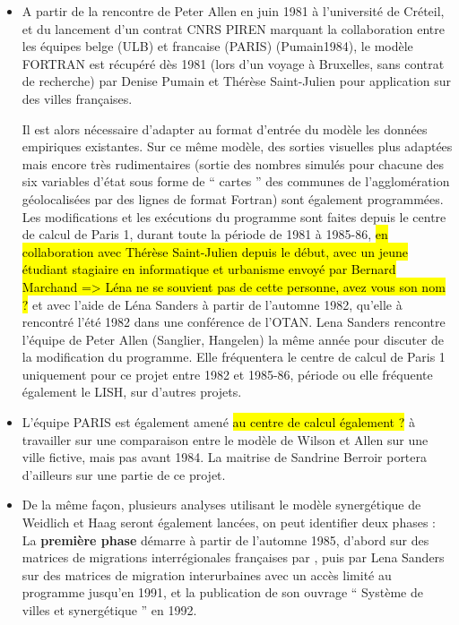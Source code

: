 \begin{itemize}[label=\textbullet]

\item A partir de la rencontre  de Peter Allen en juin 1981 à l’université de Créteil, et du lancement d’un contrat CNRS PIREN marquant la collaboration entre les équipes belge (ULB) et francaise (PARIS) (Pumain1984), le modèle FORTRAN est récupéré dès 1981 (lors d’un voyage à Bruxelles, sans contrat de recherche) par Denise Pumain et Thérèse Saint-Julien pour application sur des villes françaises.

Il est alors nécessaire d’adapter au format d’entrée du modèle les données empiriques existantes. Sur ce même modèle, des sorties visuelles plus adaptées mais encore très rudimentaires (sortie des nombres simulés pour chacune des six variables d’état sous forme de \enquote{ cartes } des communes de l’agglomération géolocalisées par des lignes de format Fortran) sont également programmées. Les modifications et les exécutions du programme sont faites depuis le centre de calcul de Paris 1, durant toute la période de 1981 à 1985-86, \hl{en collaboration avec Thérèse Saint-Julien depuis le début, avec un jeune étudiant stagiaire en informatique et urbanisme envoyé par Bernard Marchand => Léna ne se souvient pas de cette personne, avez vous son nom ?} et avec l’aide de Léna Sanders à partir de l’automne 1982, qu'elle à rencontré l'été 1982 dans une conférence de l'OTAN. Lena Sanders rencontre l'équipe de Peter Allen (Sanglier, Hangelen) la même année pour discuter de la modification du programme. Elle fréquentera le centre de calcul de Paris 1 uniquement pour ce projet entre 1982 et 1985-86, période ou elle fréquente également le LISH, sur d'autres projets.

\item L'équipe PARIS est également amené \hl{au centre de calcul également ?} à travailler sur une comparaison entre le modèle de Wilson et Allen sur une ville fictive, mais pas avant 1984. La maitrise de Sandrine Berroir portera d'ailleurs sur une partie de ce projet.

\item De la même façon, plusieurs analyses utilisant le modèle synergétique de Weidlich et Haag seront également lancées, on peut identifier deux phases : La \textbf{première phase} démarre à partir de l’automne 1985, d’abord sur des matrices de migrations interrégionales françaises par \textcite{Pumain1987}, puis par Lena Sanders sur des matrices de migration interurbaines avec un accès limité au programme jusqu’en 1991, et la publication de son ouvrage \enquote{ Système de villes et synergétique } en 1992. 


\end{itemize}
